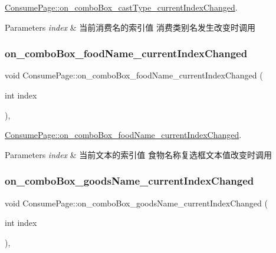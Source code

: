 \mbox{\hyperlink{class_consume_page_a6db19d3147a2143286022e5bca7dc3fa}{Consume\+Page\+::on\+\_\+combo\+Box\+\_\+cast\+Type\+\_\+current\+Index\+Changed}}. 


\begin{DoxyParams}{Parameters}
{\em index} & 当前消费名的索引值 消费类别名发生改变时调用 \\
\hline
\end{DoxyParams}
\mbox{\label{class_consume_page_a56362bbe10626bb02c7cba7e11545274}} 
\subsubsection{\texorpdfstring{on\_comboBox\_foodName\_currentIndexChanged}{on\_comboBox\_foodName\_currentIndexChanged}}
{\footnotesize\ttfamily void Consume\+Page\+::on\+\_\+combo\+Box\+\_\+food\+Name\+\_\+current\+Index\+Changed (\begin{DoxyParamCaption}\item[{int}]{index }\end{DoxyParamCaption})\hspace{0.3cm}{\ttfamily [private]}, {\ttfamily [slot]}}



\mbox{\hyperlink{class_consume_page_a56362bbe10626bb02c7cba7e11545274}{Consume\+Page\+::on\+\_\+combo\+Box\+\_\+food\+Name\+\_\+current\+Index\+Changed}}. 


\begin{DoxyParams}{Parameters}
{\em index} & 当前文本的索引值 食物名称复选框文本值改变时调用 \\
\hline
\end{DoxyParams}
\mbox{\label{class_consume_page_af5d7e2bc17a792db28f9e1dd205574e2}} 
\subsubsection{\texorpdfstring{on\_comboBox\_goodsName\_currentIndexChanged}{on\_comboBox\_goodsName\_currentIndexChanged}}
{\footnotesize\ttfamily void Consume\+Page\+::on\+\_\+combo\+Box\+\_\+goods\+Name\+\_\+current\+Index\+Changed (\begin{DoxyParamCaption}\item[{int}]{index }\end{DoxyParamCaption})\hspace{0.3cm}{\ttfamily [private]}, {\ttfamily [slot]}}




